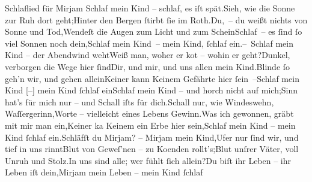            \settowidth{\longeste}{Zeile}\settowidth{\longestz}{6,}\settowidth{\longestd}{der erste – fortm}\settowidth{\longestv}{}\settowidth{\longestf}{}\addtolength\longeste{1em}
        \addtolength\longestz{1em}
        \addtolength\longestd{1em}
      \pstart\noindent{}
                  \pend\pstart\noindent{}
                  \pend\pstart\noindent{}
                  \pend{}\vspace{1em}{\vspace{1\baselineskip}}
\pstart
           {\pb}Schlaflied für Mirjam\pend
           {\vspace{1\baselineskip}}\stanza{}Schlaf mein Kind – schlaf, es iſt spät.\newverse{}Sieh, wie die Sonne zur Ruh dort geht;\newverse{}Hinter den Bergen{ }ſtirbt{ }ſie im Roth.\newverse{}Du, – du weißt nichts von Sonne und Tod,\newverse{}Wendeſt die Augen zum Licht und zum Schein\newverse{}Schlaf – es{ }ſind{ }ſo viel Sonnen noch dein,\newverse{}Schlaf mein Kind – mein Kind,{ }ſchlaf ein.\stanzaend{}\stanza{}– Schlaf mein Kind – der Abendwind weht\newverse{}Weiß man, woher er ko{\geminationm}t – wohin er geht?\newverse{}Dunkel, verborgen die Wege hier{ }ſind\newverse{}Dir, und mir, und uns allen mein Kind.\newverse{}Blinde{ }ſo geh’n wir, und gehen allein\newverse{}Keiner kann Keinem Gefährte hier{ }ſein –\newverse{}Schlaf mein Kind {[}–{]} mein Kind{ }ſchlaf ein\stanzaend{}\stanza{}{\pb}Schlaf mein Kind – und horch
                     nicht auf mich;\newverse{}Sinn hat’s für mich nur – und Schall iſts für dich.\newverse{}Schall nur, wie Windeswehn, Waſſergerinn,\newverse{}Worte – vielleicht eines Lebens Gewinn.\newverse{}Was ich gewonnen, gräbt mit mir man ein,\newverse{}Keiner ka{\geminationn} Keinem ein Erbe hier sein,\newverse{}Schlaf mein Kind – mein Kind{ }ſchlaf ein.\stanzaend{}\stanza{}Schläfſt du Mirjam? – Mirjam mein Kind,\newverse{}Ufer nur{ }ſind wir, und tief in uns rinnt\newverse{}Blut von Geweſ’nen – zu Ko{\geminationm}enden rollt’s;\newverse{}Blut unſrer Väter, voll Unruh und Stolz.\newverse{}In uns sind alle; wer fühlt{ }ſich allein?\newverse{}Du biſt ihr Leben – ihr Leben iſt dein,\newverse{}Mirjam mein Leben – mein Kind{ }ſchlaf

